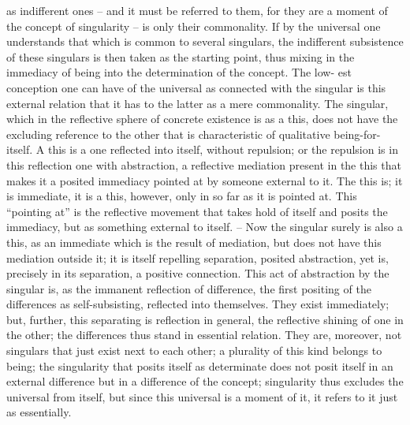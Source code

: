 as indifferent ones – and it must be referred to them, for they are a moment
of the concept of singularity – is only their commonality. If by the universal
one understands that which is common to several singulars, the indifferent
subsistence of these singulars is then taken as the starting point, thus mixing
in the immediacy of being into the determination of the concept. The low-
est conception one can have of the universal as connected with the singular
is this external relation that it has to the latter as a mere commonality.
The singular, which in the reflective sphere of concrete existence is as a
this, does not have the excluding reference to the other that is characteristic
of qualitative being-for-itself. A this is a one reflected into itself, without
repulsion; or the repulsion is in this reflection one with abstraction, a
reflective mediation present in the this that makes it a posited immediacy
pointed at by someone external to it. The this is; it is immediate, it is a
this, however, only in so far as it is pointed at. This “pointing at” is the
reflective movement that takes hold of itself and posits the immediacy, but
as something external to itself. – Now the singular surely is also a this,
as an immediate which is the result of mediation, but does not have this
mediation outside it; it is itself repelling separation, posited abstraction, yet
is, precisely in its separation, a positive connection.
This act of abstraction by the singular is, as the immanent reflection
of difference, the first positing of the differences as self-subsisting, reflected
into themselves. They exist immediately; but, further, this separating is
reflection in general, the reflective shining of one in the other; the differences
thus stand in essential relation. They are, moreover, not singulars that
just exist next to each other; a plurality of this kind belongs to being; the
singularity that posits itself as determinate does not posit itself in an external
difference but in a difference of the concept; singularity thus excludes the
universal from itself, but since this universal is a moment of it, it refers to
it just as essentially.
